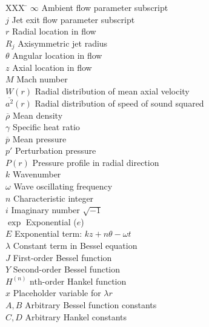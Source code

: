 \documentclass[]{aiaa-tc}%
\begin{document}
\begin{multicols}{2}
\begin{tabbing}
  XXX \= \kill%
  $\infty$            \> Ambient flow parameter subscript \\
  $j$                 \> Jet exit flow parameter subscript \\
  $r$                 \> Radial location in flow \\
  $R_j$               \> Axisymmetric jet radius \\
  $\theta$            \> Angular location in flow \\
  $z$                 \> Axial location in flow \\
  $M$                 \> Mach number \\
  $W(r)$              \> Radial distribution of mean axial velocity \\
  $\overline{a^2}(r)$ \> Radial distribution of speed of sound squared\\
  $\overline{\rho}$   \> Mean density \\
  $\gamma$            \> Specific heat ratio \\
  $\overline{p}$      \> Mean pressure \\
  $p'$                \> Perturbation pressure \\
  $P(r)$              \> Pressure profile in radial direction  \\
  $k$                 \> Wavenumber \\
  $\omega$            \> Wave oscillating frequency \\
  $n$                 \> Characteristic integer \\
  $i$                 \> Imaginary number $\sqrt{-1}$ \\
  $\exp$              \> Exponential ($e$) \\
  $E$                 \> Exponential term: $kz + n\theta -\omega t$ \\
  $\lambda$           \> Constant term in Bessel equation \\
  $J$                 \> First-order Bessel function \\
  $Y$                 \> Second-order Bessel function \\
  $H^{(n)}$           \> nth-order Hankel function \\
  $x$                 \> Placeholder variable for $\lambda r$ \\
  $A,B$               \> Arbitrary Bessel function constants \\
  $C,D$               \> Arbitrary Hankel constants \\

\end{tabbing}
\end{multicols}
\end{document}
